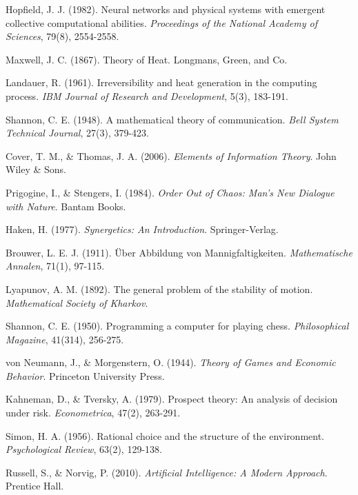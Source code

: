 \documentclass[12pt,a4paper]{article}
\begin{document}

\begin{thebibliography}{99}

Hopfield, J. J. (1982). Neural networks and physical systems with emergent collective computational abilities. \textit{Proceedings of the National Academy of Sciences}, 79(8), 2554-2558.

Maxwell, J. C. (1867). Theory of Heat. Longmans, Green, and Co.

Landauer, R. (1961). Irreversibility and heat generation in the computing process. \textit{IBM Journal of Research and Development}, 5(3), 183-191.

Shannon, C. E. (1948). A mathematical theory of communication. \textit{Bell System Technical Journal}, 27(3), 379-423.

Cover, T. M., \& Thomas, J. A. (2006). \textit{Elements of Information Theory}. John Wiley \& Sons.

Prigogine, I., \& Stengers, I. (1984). \textit{Order Out of Chaos: Man's New Dialogue with Nature}. Bantam Books.

Haken, H. (1977). \textit{Synergetics: An Introduction}. Springer-Verlag.

Brouwer, L. E. J. (1911). Über Abbildung von Mannigfaltigkeiten. \textit{Mathematische Annalen}, 71(1), 97-115.

Lyapunov, A. M. (1892). The general problem of the stability of motion. \textit{Mathematical Society of Kharkov}.

Shannon, C. E. (1950). Programming a computer for playing chess. \textit{Philosophical Magazine}, 41(314), 256-275.

von Neumann, J., \& Morgenstern, O. (1944). \textit{Theory of Games and Economic Behavior}. Princeton University Press.

Kahneman, D., \& Tversky, A. (1979). Prospect theory: An analysis of decision under risk. \textit{Econometrica}, 47(2), 263-291.

Simon, H. A. (1956). Rational choice and the structure of the environment. \textit{Psychological Review}, 63(2), 129-138.

Russell, S., \& Norvig, P. (2010). \textit{Artificial Intelligence: A Modern Approach}. Prentice Hall.


\end{thebibliography}
\end{document}
